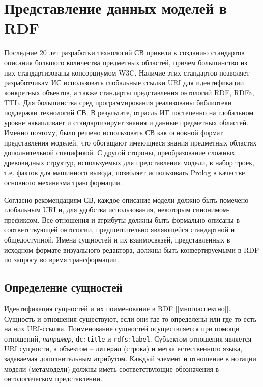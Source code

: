 \documentclass[conference]{IEEEtran} \IEEEoverridecommandlockouts
\begin{document}
\section{Представление данных моделей в RDF} \label{sec:rdf-repr} 

Последние 20 лет разработки технологий СВ привели к созданию стандартов описания большого количества предметных областей, причем большинство из них стандартизованы консорциумом W3C. Наличие этих стандартов позволяет разработчикам ИС использовать глобальные ссылки URI для идентификации конкретных объектов, а также стандарты представления онтологий RDF, RDFa, TTL.  Для большинства сред программирования реализованы библиотеки поддержки технологий СВ. В результате, отрасль ИТ постепенно на глобальном уровне накапливает и стандартизирует знания и данные предметных областей. Именно поэтому, было решено использовать СВ как основной формат представления моделей, что обогащают имеющиеся знания предметных областях дополнительной спецификой. С другой стороны, преобразование сложных древовидных структур, используемых для представления модели, в набор троек, т.е. фактов для машинного вывода, позволяет использовать Prolog в качестве основного механизма трансформации. 

Согласно рекомендациям СВ, каждое описание модели должно быть помечено глобальным URI и, для удобства использования, некоторым синонимом-префиксом. Все отношения и атрибуты должны быть формально описаны в соответствующей онтологии, предпочтительно являющейся стандартной и общедоступной. Имена сущностей и их взаимосвязей, представленных в исходном формате визуального редактора, должны быть конвертируемыми в RDF по запросу во время трансформации. 

\subsection{Определение сущностей} \label{sec:ent-def} 

Идентификация сущностей и их поименование в RDF [[многоаспектно]]. Сущность и отношения существуют, если они где-то определены или где-то есть на них URI-ссылка. Поименование сущностей осуществляется при помощи отношений, \emph{например}, \texttt{dc:title} и \texttt{rdfs:label}. Субъектом отношения является URI сущности, а объектом -- \texttt{литерал} (строка) и метка естественного языка, задаваемая дополнительным атрибутом. Каждый элемент и отношение в нотации модели (метамодели) должны иметь соответствующие обозначения в онтологическом представлении. 
\end{document}

